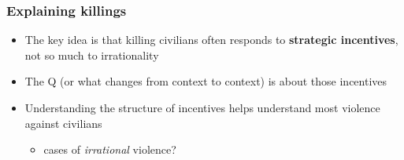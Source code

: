 \documentclass[aspectratio=43]{beamer}
\begin{document}
\begin{frame}
\frametitle{Explaining killings}
\centering

\begin{itemize}
  \item The key idea is that killing civilians often responds to \textbf{strategic incentives}, not so much to irrationality
  \item The Q (or what changes from context to context) is about those incentives
  \item Understanding the structure of incentives helps understand most violence against civilians
  \begin{itemize}
    \item<2-> cases of \textit{irrational} violence?
  \end{itemize}
\end{itemize}

\end{frame}
\end{document}

